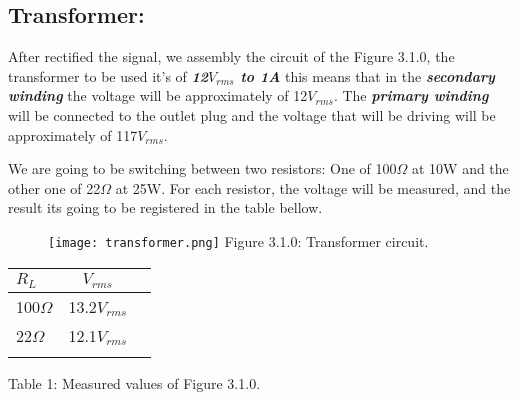 \subsection{Transformer:}

After rectified the signal, we assembly the circuit of the Figure 3.1.0, the transformer to be used it's of {\bfseries\itshape 12$V_{rms}$ to 1A} this means that in the {\bfseries\itshape secondary winding} the voltage will be approximately of 12$V_{rms}$. The {\bfseries\itshape primary winding} will be connected to the outlet plug and the voltage that will be driving will be approximately of 117$V_{rms}$. \hfill \break

We are going to be switching between two resistors: One of 100$\Omega$ at 10W and the other one of 22$\Omega$ at 25W. For each resistor, the voltage will be measured, and the result its going to be registered in the table bellow. \hfill \break

\begin{multicols}{2}
\begin{figure}[H]
\texttt{[image: transformer.png]}
\centering \linebreak \linebreak Figure 3.1.0: Transformer circuit.
\end{figure}

{\Large
\begin{center}
\begin{tabular}[.5cm]{l c c }
\toprule
$R_{L}$ & $V_{rms}$ \\
\midrule
100$\Omega$ & 13.2$V_{rms}$ \\
\cmidrule{1-2}
22$\Omega$ & 12.1$V_{rms}$ \\
\bottomrule
\linebreak
\end{tabular}
\end{center} }
    Table 1: Measured values of Figure 3.1.0.
\end{multicols}